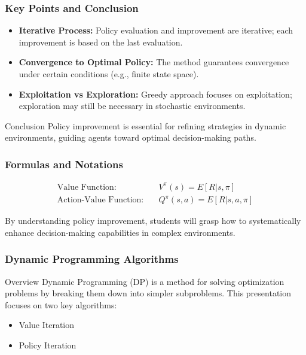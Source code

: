 \documentclass[aspectratio=169]{beamer}
\begin{document}
\begin{frame}[fragile]
  \frametitle{Key Points and Conclusion}
  \begin{itemize}
    \item \textbf{Iterative Process:} Policy evaluation and improvement are iterative; each improvement is based on the last evaluation.
    
    \item \textbf{Convergence to Optimal Policy:} The method guarantees convergence under certain conditions (e.g., finite state space).
    
    \item \textbf{Exploitation vs Exploration:} Greedy approach focuses on exploitation; exploration may still be necessary in stochastic environments.
  \end{itemize}
  
  \begin{block}{Conclusion}
    Policy improvement is essential for refining strategies in dynamic environments, guiding agents toward optimal decision-making paths.
  \end{block}
\end{frame}

\begin{frame}[fragile]
  \frametitle{Formulas and Notations}
  \begin{align*}
    \text{Value Function:} & \quad V^{\pi}(s) = E[R | s, \pi] \\
    \text{Action-Value Function:} & \quad Q^{\pi}(s, a) = E[R | s, a, \pi]
  \end{align*}
  
  By understanding policy improvement, students will grasp how to systematically enhance decision-making capabilities in complex environments.
\end{frame}

\begin{frame}[fragile]
    \frametitle{Dynamic Programming Algorithms}
    \begin{block}{Overview}
        Dynamic Programming (DP) is a method for solving optimization problems by breaking them down into simpler subproblems. This presentation focuses on two key algorithms:
        \begin{itemize}
            \item Value Iteration
            \item Policy Iteration
        \end{itemize}
    \end{block}
\end{frame}
\end{document}
